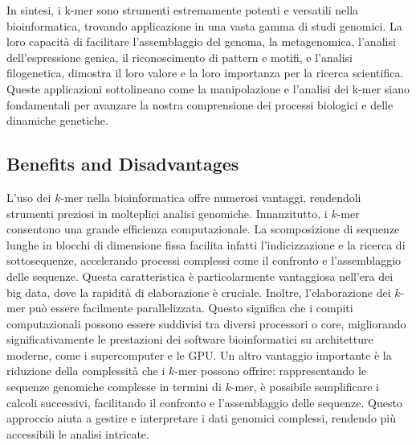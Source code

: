 	In sintesi, i k-mer sono strumenti estremamente potenti e versatili nella bioinformatica, trovando applicazione in una vasta gamma di studi genomici. La loro capacità di facilitare l'assemblaggio del genoma, la metagenomica, l'analisi dell'espressione genica, il riconoscimento di pattern e motifi, e l'analisi filogenetica, dimostra il loro valore e la loro importanza per la ricerca scientifica. Queste applicazioni sottolineano come la manipolazione e l'analisi dei k-mer siano fondamentali per avanzare la nostra comprensione dei processi biologici e delle dinamiche genetiche.




	\subsection{Benefits and Disadvantages}
	\label{subsec:kmer-benefit-and-disadvantages}
	
	L'uso dei $k$-mer nella bioinformatica offre numerosi vantaggi, rendendoli strumenti preziosi in molteplici analisi genomiche. Innanzitutto, i $k$-mer consentono una grande efficienza computazionale. La scomposizione di sequenze lunghe in blocchi di dimensione fissa facilita infatti l'indicizzazione e la ricerca di sottosequenze, accelerando processi complessi come il confronto e l'assemblaggio delle sequenze. Questa caratteristica è particolarmente vantaggiosa nell'era dei big data, dove la rapidità di elaborazione è cruciale. Inoltre, l'elaborazione dei $k$-mer può essere facilmente parallelizzata. Questo significa che i compiti computazionali possono essere suddivisi tra diversi processori o core, migliorando significativamente le prestazioni dei software bioinformatici su architetture moderne, come i supercomputer e le GPU. Un altro vantaggio importante è la riduzione della complessità che i $k$-mer possono offrire: rappresentando le sequenze genomiche complesse in termini di $k$-mer, è possibile semplificare i calcoli successivi, facilitando il confronto e l'assemblaggio delle sequenze. Questo approccio aiuta a gestire e interpretare i dati genomici complessi, rendendo più accessibili le analisi intricate.
	
